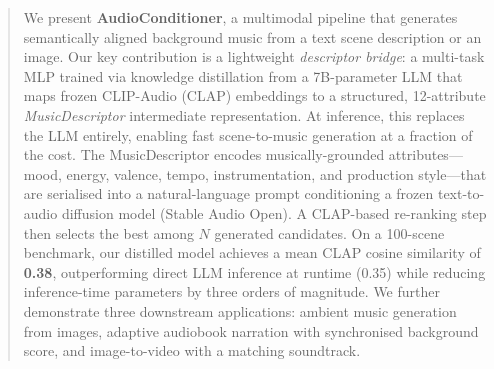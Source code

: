 \begin{abstract}
We present \textbf{AudioConditioner}, a multimodal pipeline that generates
semantically aligned background music from a text scene description or an
image.
Our key contribution is a lightweight \emph{descriptor bridge}: a multi-task
MLP trained via knowledge distillation from a 7B-parameter LLM that maps
frozen CLIP-Audio (CLAP) embeddings to a structured, 12-attribute
\emph{MusicDescriptor} intermediate representation.
At inference, this replaces the LLM entirely, enabling fast scene-to-music
generation at a fraction of the cost.
The MusicDescriptor encodes musically-grounded attributes---mood, energy,
valence, tempo, instrumentation, and production style---that are serialised
into a natural-language prompt conditioning a frozen text-to-audio diffusion
model (Stable Audio Open).
A CLAP-based re-ranking step then selects the best among $N$ generated
candidates.
On a 100-scene benchmark, our distilled model achieves a mean CLAP cosine
similarity of \textbf{0.38}, outperforming direct LLM inference at runtime
(0.35) while reducing inference-time parameters by three orders of magnitude.
We further demonstrate three downstream applications: ambient music generation
from images, adaptive audiobook narration with synchronised background score,
and image-to-video with a matching soundtrack.
\end{abstract}
